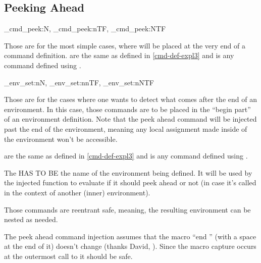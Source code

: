 \documentclass[10pt]{article}
\begin{document}
\subsection{Peeking Ahead}\label{peek-expl3}

\begin{codedescribe}[code,update=2025/10/07]{\xpeekahead_cmd_peek:N, \xpeekahead_cmd_peek:nTF, \xpeekahead_cmd_peek:NTF}
\begin{codesyntax}%
\end{codesyntax}
Those are for the most simple cases, where  will be placed at the very end of a command definition.  are the same as defined in \ref{cmd-def-expl3} and  is any command defined using .
\end{codedescribe}


\begin{codedescribe}[code,update=2025/10/07]{\xpeekahead_env_set:nN, \xpeekahead_env_set:nnTF, \xpeekahead_env_set:nNTF}
\begin{codesyntax}%
\end{codesyntax}
Those are for the cases where one wants to detect what comes after the end of an environment. In this case, those commands are to be placed in the ``begin part'' of an environment definition. Note that the peek ahead command will be injected past the end of the environment, meaning any local assignment made inside of the environment won't be accessible. 

 are the same as defined in \ref{cmd-def-expl3} and  is any command defined using .
\end{codedescribe}
\begin{tsremark}
  The  HAS TO BE the name of the environment being defined. It will be used by the injected function to evaluate if it should peek ahead or not (in case it's called in the context of another  (inner) environment).
\end{tsremark}
\begin{tsremark}
  Those commands are reentrant safe, meaning, the resulting environment can be nested as needed.
\end{tsremark}
\begin{tsremark}
  The peek ahead command injection assumes that the macro ``end '' (with a space at the end of it) doesn't change (thanks David, \cite{stackexchange}). Since the macro capture occurs at the outermost call to  it should be safe.
\end{tsremark}
\end{document}
